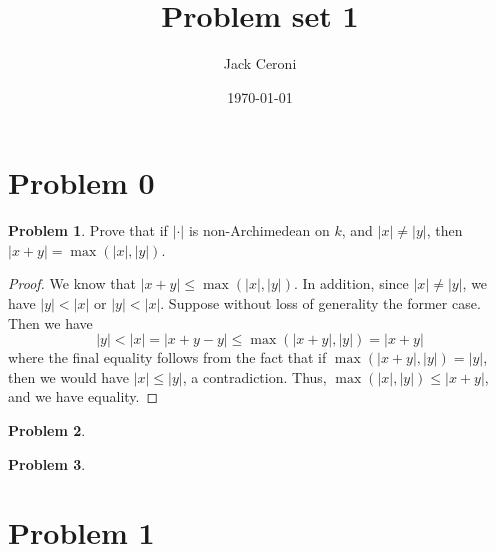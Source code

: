 \documentclass[aps,pra,showpacs,notitlepage,onecolumn,superscriptaddress,nofootinbib,oneside,10pt]{article}
\theoremstyle{definition}
\newtheorem{problem}{Problem}[section]
\begin{document}
\title{Problem set 1}
\author{Jack Ceroni}
\date{\today}
\maketitle

\tableofcontents

\section{Problem 0}

\begin{problem}
  Prove that if $|\cdot|$ is non-Archimedean on $k$, and $|x| \neq |y|$, then $|x + y| = \max(|x|, |y|)$.
  \end{problem}
\begin{proof}
  We know that $|x + y| \leq \max(|x|, |y|)$. In addition, since $|x| \neq |y|$, we have $|y| < |x|$ or $|y| < |x|$. Suppose without loss of generality
  the former case. Then we have
  \begin{equation}
    |y| < |x| = |x + y - y| \leq \max(|x + y|, |y|) = |x + y|
    \end{equation}
  where the final equality follows from the fact that if $\max(|x + y|, |y|) = |y|$, then we would have $|x| \leq |y|$, a contradiction. Thus, $\max(|x|, |y|) \leq |x + y|$,
  and we have equality.
  \end{proof}

\begin{problem}

  \end{problem}

\begin{problem}

  \end{problem}

\section{Problem 1}
\end{document}
